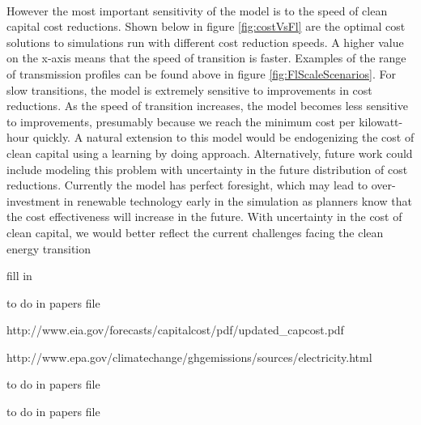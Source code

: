 \documentclass{easychithesis}
\begin{document}
\paragraph{} However the most important sensitivity of the model is to the speed of clean capital cost reductions. Shown below in figure \ref{fig:costVsFl} are the optimal cost solutions to simulations run with different cost reduction speeds. A higher value on the x-axis means that the speed of transition is faster. Examples of the range of transmission profiles can be found above in figure \ref{fig:FlScaleScenarios}. For slow transitions, the model is extremely sensitive to improvements in cost reductions. As the speed of transition increases, the model becomes less sensitive to improvements, presumably because we reach the minimum cost per kilowatt-hour quickly. A natural extension to this model would be endogenizing the cost of clean capital using a learning by doing approach. Alternatively, future work could include modeling this problem with uncertainty in the future distribution of cost reductions. Currently the model has perfect foresight, which may lead to over-investment in renewable technology early in the simulation as planners know that the cost effectiveness will increase in the future. With uncertainty in the cost of clean capital, we would better reflect the current challenges facing the clean energy transition











\singlespacing
\pagebreak
{}

\begin{thebibliography}{99}

fill in

to do in papers file


http://www.eia.gov/forecasts/capitalcost/pdf/updated\_capcost.pdf

http://www.epa.gov/climatechange/ghgemissions/sources/electricity.html

to do in papers file

to do in papers file


\end{thebibliography}
\end{document}
